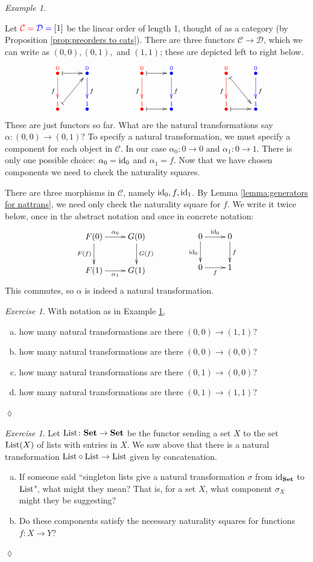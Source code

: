 \documentclass{book}
\def\tn{\textnormal}
\def\mc{\mathcal}
\def\List{\tn{List}}
\def\to{\rightarrow}
\def\taking{\colon}
\newcommand{\LMO}[1]{\stackrel{#1}{\bullet}}
\def\id{\tn{id}}
\def\Set{{\bf Set}}
\def\mcC{\mc{C}}
\def\mcD{\mc{D}}
\theoremstyle{remark}
\newtheorem{example}[subsubsection]{Example}
\newtheorem{exc}[subsubsection]{Exercise}
\newenvironment{exercise}{\begin{exc}}{\hspace*{\fill}$\lozenge$\end{exc}}
\theoremstyle{definition}
\def\sexc{\begin{enumerate}[a.)]\setlength{\itemsep}{.1cm}\setlength{\parskip}{.1cm}\item}
\def\next{\item}
\def\endsexc{\end{enumerate}}
\begin{document}
\begin{example}\label{ex:nattrans [1]}

Let $\color{red}{\mcC}=\color{blue}{\mcD}=\color{black}{[1]}$ be the linear order of length 1, thought of as a category (by Proposition \ref{prop:preorders to cats}). There are three functors $\mcC\to\mcD$, which we can write as $(0,0), (0,1),$ and $(1,1)$; these are depicted left to right below.
$$\xymatrix{
\LMO{\color{red}{0}}\ar@{|->}[r]\ar@[red][d]_f&\LMO{\color{blue}{0}}\ar@[blue][d]^f&&\LMO{\color{red}{0}}\ar@{|->}[r]\ar@[red][d]_f&\LMO{\color{blue}{0}}\ar@[blue][d]^f&&\LMO{\color{red}{0}}\ar@{|->}[dr]\ar@[red][d]_f&\LMO{\color{blue}{0}}\ar@[blue][d]^f\\
\LMO{\color{red}{1}}\ar@{|->}[ur]&\LMO{\color{blue}{1}}&&\LMO{\color{red}{1}}\ar@{|->}[r]&\LMO{\color{blue}{1}}&&\LMO{\color{red}{1}}\ar@{|->}[r]&\LMO{\color{blue}{1}}
}
$$
These are just functors so far. What are the natural transformations say $\alpha\taking (0,0)\to(0,1)$? To specify a natural transformation, we must specify a component for each object in $\mcC$. In our case $\alpha_0\taking 0\to 0$ and $\alpha_1\taking 0\to 1$. There is only one possible choice: $\alpha_0=\id_0$ and $\alpha_1=f$. Now that we have chosen components we need to check the naturality squares. 

There are three morphisms in $\mcC$, namely $\id_0, f, \id_1$. By Lemma \ref{lemma:generators for nattrans}, we need only check the naturality square for $f$. We write it twice below, once in the abstract notation and once in concrete notation:
$$
\xymatrix{
F(0)\ar[r]^{\alpha_0}\ar[d]_{F(f)}&G(0)\ar[d]^{G(f)}\\
F(1)\ar[r]_{\alpha_1}&G(1)
}\hspace{.5in}
\xymatrix{
0\ar[r]^{\id_0}\ar[d]_{\id_0}&0\ar[d]^{f}\\
0\ar[r]_{f}&1
}
$$
This commutes, so $\alpha$ is indeed a natural transformation.

\end{example}

\begin{exercise}
With notation as in Example \ref{ex:nattrans [1]},
\sexc how many natural transformations are there $(0,0)\to (1,1)$?
\next how many natural transformations are there $(0,0)\to (0,0)$?
\next how many natural transformations are there $(0,1)\to (0,0)$?
\next how many natural transformations are there $(0,1)\to (1,1)$?
\endsexc
\end{exercise}

\begin{exercise}
Let $\List\taking\Set\to\Set$ be the functor sending a set $X$ to the set $\List(X)$ of lists with entries in $X$. We saw above that there is a natural transformation $\List\circ\List\to\List$ given by concatenation.
\sexc If someone said ``singleton lists give a natural transformation $\sigma$ from $\id_\Set$ to $\List$", what might they mean? That is, for a set $X$, what component $\sigma_X$ might they be suggesting?
\next Do these components satisfy the necessary naturality squares for functions $f\taking X\to Y$?
\endsexc
\end{exercise}
\end{document}
